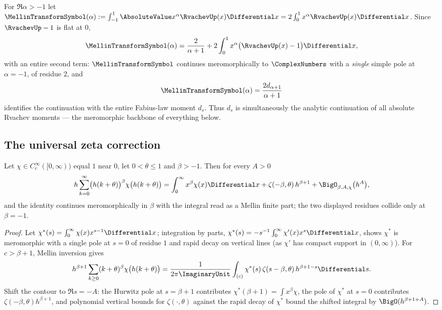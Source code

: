 \documentclass[11pt,oneside]{article}
\numberwithin{equation}{section}
\theoremstyle{definition}
\theoremstyle{remark}
\begin{document}
For $\Re\alpha>-1$ let
$\MellinTransformSymbol(\alpha):=\int_{-1}^{1}\AbsoluteValue x^{\alpha}\RvachevUp(x)\Differential x
=2\int_0^1x^{\alpha}\RvachevUp(x)\Differential x$.  Since $\RvachevUp-1$ is flat at $0$,
\begin{equation}
 \MellinTransformSymbol(\alpha)
 =\frac{2}{\alpha+1}
 +2\int_0^1x^{\alpha}\bigl(\RvachevUp(x)-1\bigr)\Differential x,
 \label{eq:Mellin-continuation}
\end{equation}
with an entire second term: $\MellinTransformSymbol$ continues meromorphically to $\ComplexNumbers$
with a \emph{single} simple pole at $\alpha=-1$, of residue $2$, and
\begin{equation}
 \MellinTransformSymbol(\alpha)=\frac{2d_{\alpha+1}}{\alpha+1}
 \label{eq:Mellin-d}
\end{equation}
identifies the continuation with the entire Fabius-law moment
$d_s$.  Thus $d_s$ is simultaneously the analytic continuation of all
absolute Rvachev moments --- the meromorphic backbone of everything
below.

\subsection{The universal zeta correction}

\begin{lemma}
\label{lem:cutoff-mellin}
Let $\chi\in C_c^\infty([0,\infty))$ equal $1$ near $0$, let
$0<\theta\le1$ and $\beta>-1$.  Then for every $A>0$
\begin{equation}
 h\sum_{k=0}^{\infty}\bigl(h(k+\theta)\bigr)^{\beta}
 \chi\bigl(h(k+\theta)\bigr)
 =\int_0^{\infty}x^{\beta}\chi(x)\Differential x
 +\zeta(-\beta,\theta)\,h^{\beta+1}
 +\BigO_{\beta,A,\chi}\bigl(h^{A}\bigr),
 \label{eq:cutoff-mellin}
\end{equation}
and the identity continues meromorphically in $\beta$ with the
integral read as a Mellin finite part; the two displayed residues
collide only at $\beta=-1$.
\end{lemma}

\begin{proof}
Let $\chi^{*}(s)=\int_0^\infty\chi(x)x^{s-1}\Differential x$; integration by
parts, $\chi^{*}(s)=-s^{-1}\int_0^\infty\chi'(x)x^{s}\Differential x$, shows
$\chi^{*}$ is meromorphic with a single pole at $s=0$ of residue
$1$ and rapid decay on vertical lines (as $\chi'$ has compact support
in $(0,\infty)$).  For $c>\beta+1$, Mellin inversion gives
\[
 h^{\beta+1}\sum_{k\ge0}(k+\theta)^{\beta}
 \chi\bigl(h(k+\theta)\bigr)
 =\frac{1}{2\pi\ImaginaryUnit}\int_{(c)}
 \chi^{*}(s)\,\zeta(s-\beta,\theta)\,h^{\beta+1-s}\Differential s.
\]
Shift the contour to $\Re s=-A$: the Hurwitz pole at $s=\beta+1$
contributes $\chi^{*}(\beta+1)=\int x^{\beta}\chi$, the pole of
$\chi^{*}$ at $s=0$ contributes $\zeta(-\beta,\theta)h^{\beta+1}$,
and polynomial vertical bounds for $\zeta(\cdot,\theta)$ against the
rapid decay of $\chi^{*}$ bound the shifted integral by
$\BigO(h^{\beta+1+A})$.
\end{proof}
\end{document}

